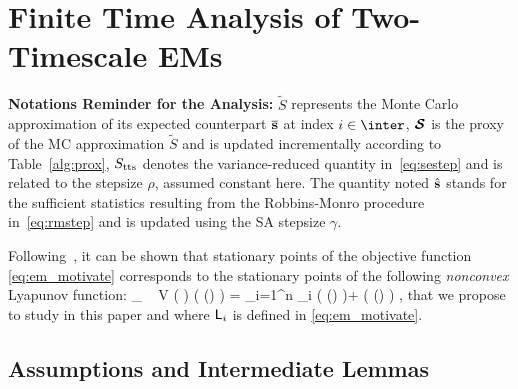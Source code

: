 \documentclass[journal, 11pt]{IEEEtran}
\begin{document}



\section{Finite Time Analysis of Two-Timescale EMs} \label{sec:mainanalysis}
\textbf{Notations Reminder for the Analysis:}
$\tilde{S}$ represents the Monte Carlo approximation of its expected counterpart $\overline{{\mathbf{s}}}$ at index $i \in \inter$, ${\bm{\mathcal{S}}}$ is the proxy of the MC approximation $\tilde{S}$ and is updated incrementally according to Table~\ref{alg:prox}, $S_{\textrm{tts}}$ denotes the variance-reduced quantity in~\eqref{eq:sestep} and is related to the stepsize $\rho$, assumed constant here.
The quantity noted $\hat{{\mathbf{s}}}$ stands for the sufficient statistics resulting from the Robbins-Monro procedure in~\eqref{eq:rmstep} and is updated using the SA stepsize $\gamma$.

Following~\cite{cappe2009line}, it can be shown that stationary points of the objective function \eqref{eq:em_motivate} corresponds to the stationary points of the following \textit{nonconvex} Lyapunov function:
\beq\label{eq:em_sspace}
\min_{ {\bss} \in \Sset }~  V ( {\bss} ) \eqdef \overline\calL( \op(\bss) ) =   \sum_{i=1}^n  \calL _i (  \op(\bss) )+ \Pen (  \op(\bss) ) \eqs,
\eeq
that we propose to study in this paper and where ${\textsf{L}} _i$ is defined in \eqref{eq:em_motivate}.


\subsection{Assumptions and Intermediate Lemmas}
\end{document}
